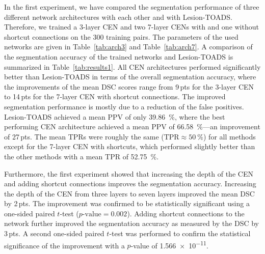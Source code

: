 In the first experiment, we have compared the segmentation performance of three
different network architectures with each other and with Lesion-TOADS.
Therefore, we trained a 3-layer CEN and two 7-layer CENs with and one without
shortcut connections on the 300 training pairs. The parameters of the used
networks are given in Table~\ref{tab:arch3} and Table~\ref{tab:arch7}. A
comparison of the segmentation accuracy of the trained networks and Lesion-TOADS
is summarized in Table~\ref{tab:results1}. All CEN architectures performed
significantly better than Lesion-TOADS in terms of the overall segmentation
accuracy, where the improvements of the mean DSC scores range from 9\,pts for
the 3-layer CEN to 14\,pts for the 7-layer CEN with shortcut connections. The
improved segmentation performance is mostly due to a reduction of the false
positives. Lesion-TOADS achieved a mean PPV of only \SI{39.86}{\percent}, where
the best performing CEN architecture achieved a mean PPV of
\SI{66.58}{\percent}---an improvement of 27\,pts. The mean TPRs were roughly the
same ($\text{TPR}\approx \SI{50}{\percent}$) for all methods except for the
7-layer CEN with shortcuts, which performed slightly better than the other
methods with a mean TPR of \SI{52.75}{\percent}.

Furthermore, the first experiment showed that increasing the depth of the CEN
and adding shortcut connections improves the segmentation accuracy. Increasing
the depth of the CEN from three layers to seven layers improved the mean DSC by
2\,pts. The improvement was confirmed to be statistically significant using a
one-sided paired $t$-test ($p\text{-value}=\num{0.002}$). Adding shortcut
connections to the network further improved the segmentation accuracy as
measured by the DSC by 3\,pts. A second one-sided paired $t$-test was performed
to confirm the statistical significance of the improvement with a $p$-value of
\num{1.566e-11}.


